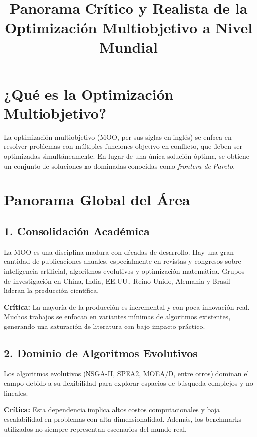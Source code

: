 \documentclass[12pt]{article}
\title{\textbf{Panorama Crítico y Realista de la Optimización Multiobjetivo a Nivel Mundial}}
\author{}
\date{}
\begin{document}
\maketitle

\section*{¿Qué es la Optimización Multiobjetivo?}

La optimización multiobjetivo (MOO, por sus siglas en inglés) se enfoca en resolver problemas con múltiples funciones objetivo en conflicto, que deben ser optimizadas simultáneamente. En lugar de una única solución óptima, se obtiene un conjunto de soluciones no dominadas conocidas como \textit{frontera de Pareto}.

\section*{Panorama Global del Área}

\subsection*{1. Consolidación Académica}

La MOO es una disciplina madura con décadas de desarrollo. Hay una gran cantidad de publicaciones anuales, especialmente en revistas y congresos sobre inteligencia artificial, algoritmos evolutivos y optimización matemática. Grupos de investigación en China, India, EE.UU., Reino Unido, Alemania y Brasil lideran la producción científica.

\textbf{Crítica:} La mayoría de la producción es incremental y con poca innovación real. Muchos trabajos se enfocan en variantes mínimas de algoritmos existentes, generando una saturación de literatura con bajo impacto práctico.

\subsection*{2. Dominio de Algoritmos Evolutivos}

Los algoritmos evolutivos (NSGA-II, SPEA2, MOEA/D, entre otros) dominan el campo debido a su flexibilidad para explorar espacios de búsqueda complejos y no lineales.

\textbf{Crítica:} Esta dependencia implica altos costos computacionales y baja escalabilidad en problemas con alta dimensionalidad. Además, los benchmarks utilizados no siempre representan escenarios del mundo real.
\end{document}
